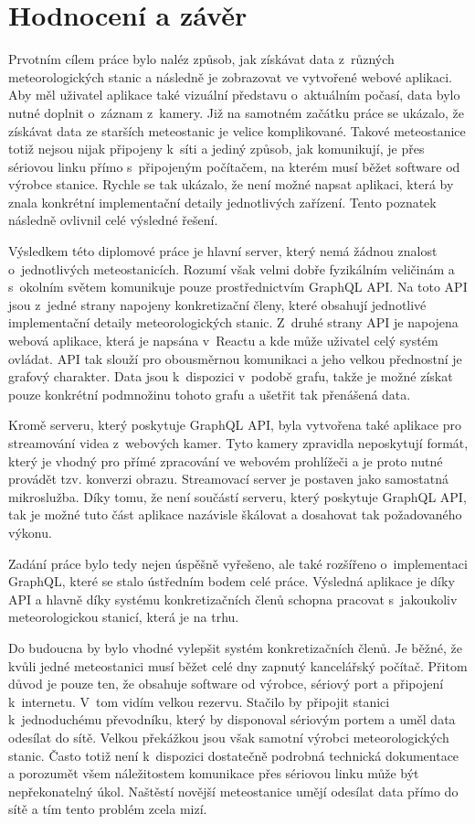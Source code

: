 \chapter{Hodnocení a závěr}

Prvotním cílem práce bylo naléz způsob, jak získávat data z~různých meteorologických stanic a následně je zobrazovat ve vytvořené webové aplikaci. Aby měl uživatel aplikace také vizuální představu o~aktuálním počasí, data bylo nutné doplnit o~záznam z~kamery. Již na samotném začátku práce se ukázalo, že získávat data ze starších meteostanic je velice komplikované. Takové meteostanice totiž nejsou nijak připojeny k~síti a jediný způsob, jak komunikují, je přes sériovou linku přímo s~připojeným počítačem, na kterém musí běžet software od výrobce stanice. Rychle se tak ukázalo, že není možné napsat aplikaci, která by znala konkrétní implementační detaily jednotlivých zařízení. Tento poznatek následně ovlivnil celé výsledné řešení.

Výsledkem této diplomové práce je hlavní server, který nemá žádnou znalost o~jednotlivých meteostanicích. Rozumí však velmi dobře fyzikálním veličinám a s~okolním světem komunikuje pouze prostřednictvím GraphQL API. Na toto API jsou z~jedné strany napojeny konkretizační členy, které obsahují jednotlivé implementační detaily meteorologických stanic. Z~druhé strany API je napojena webová aplikace, která je napsána v~Reactu a kde může uživatel celý systém ovládat. API tak slouží pro obousměrnou komunikaci a jeho velkou přednostní je grafový charakter. Data jsou k~dispozici v~podobě grafu, takže je možné získat pouze konkrétní podmnožinu tohoto grafu a ušetřit tak přenášená data.

Kromě serveru, který poskytuje GraphQL API, byla vytvořena také aplikace pro streamování videa z~webových kamer. Tyto kamery zpravidla neposkytují formát, který je vhodný pro přímé zpracování ve webovém prohlížeči a je proto nutné provádět tzv.  konverzi obrazu. Streamovací server je postaven jako samostatná mikroslužba. Díky tomu, že není součástí serveru, který poskytuje GraphQL API, tak je možné tuto část aplikace nazávisle škálovat a dosahovat tak požadovaného výkonu.

Zadání práce bylo tedy nejen úspěšně vyřešeno, ale také rozšířeno o~implementaci GraphQL, které se stalo ústředním bodem celé práce. Výsledná aplikace je díky API a hlavně díky systému konkretizačních členů schopna pracovat s~jakoukoliv meteorologickou stanicí, která je na trhu.

Do budoucna by bylo vhodné vylepšit systém konkretizačních členů. Je běžné, že kvůli jedné meteostanici musí běžet celé dny zapnutý kancelářský počítač. Přitom důvod je pouze ten, že obsahuje software od výrobce, sériový port a připojení k~internetu. V~tom vidím velkou rezervu. Stačilo by připojit stanici k~jednoduchému převodníku, který by disponoval sériovým portem a uměl data odesílat do sítě. Velkou překážkou jsou však samotní výrobci meteorologických stanic. Často totiž není k~dispozici dostatečně podrobná technická dokumentace a porozumět všem náležitostem komunikace přes sériovou linku může být nepřekonatelný úkol. Naštěstí novější meteostanice umějí odesílat data přímo do sítě a tím tento problém zcela mizí.

